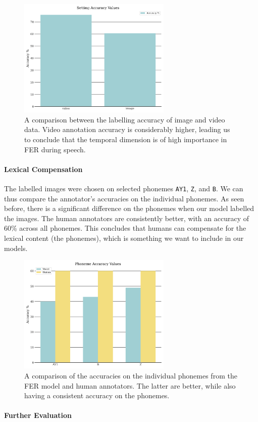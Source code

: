 \begin{figure}
    \centering
    \includegraphics[width=0.65\textwidth]{res/Setting_overview.png}
    \caption{A comparison between the labelling accuracy of image and video data. Video annotation accuracy is considerably higher, leading us to conclude that the temporal dimension is of high importance in FER during speech.}
    \label{fig:setting_overview}
\end{figure}

\paragraph{Lexical Compensation}
The labelled images were chosen on selected phonemes \texttt{AY1}, \texttt{Z}, and \texttt{B}. We can thus compare the annotator's accuracies on the individual phonemes. As seen before, there is a significant difference on the phonemes when our model labelled the images. The human annotators are consistently better, with an accuracy of 60\% across all phonemes. This concludes that humans can compensate for the lexical content (the phonemes), which is something we want to include in our models.

\begin{figure}
    \centering
    \includegraphics[width=0.65\textwidth]{res/Phone_model_acc.png}
    \caption{A comparison of the accuracies on the individual phonemes from the FER model and human annotators. The latter are better, while also having a consistent accuracy on the phonemes.}
    \label{fig:phone_model_human}
\end{figure}

\paragraph{Further Evaluation}
